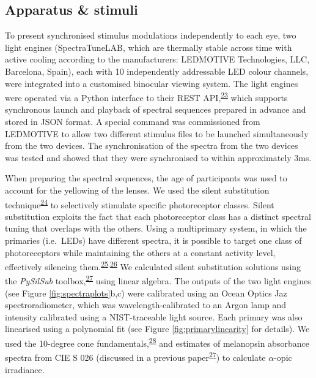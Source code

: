 \documentclass[
]{article}
\begin{document}
\hypertarget{apparatus-stimuli}{%
\subsection{Apparatus \& stimuli}\label{apparatus-stimuli}}

To present synchronised stimulus modulations independently to each eye, two light engines (SpectraTuneLAB, which are thermally stable across time with active cooling according to the manufacturers: LEDMOTIVE Technologies, LLC, Barcelona, Spain), each with 10 independently addressable LED colour channels, were integrated into a customised binocular viewing system. The light engines were operated via a Python interface to their REST API,\textsuperscript{\protect\hyperlink{ref-Martin2022}{23}} which supports synchronous launch and playback of spectral sequences prepared in advance and stored in JSON format. A special command was commissioned from LEDMOTIVE to allow two different stimulus files to be launched simultaneously from the two devices. The synchronisation of the spectra from the two devices was tested and showed that they were synchronised to within approximately 3ms.

When preparing the spectral sequences, the age of participants was used to account for the yellowing of the lenses. We used the silent substitution technique\textsuperscript{\protect\hyperlink{ref-Estevez1982}{24}} to selectively stimulate specific photoreceptor classes. Silent substitution exploits the fact that each photoreceptor class has a distinct spectral tuning that overlaps with the others. Using a multiprimary system, in which the primaries (i.e.~LEDs) have different spectra, it is possible to target one class of photoreceptors while maintaining the others at a constant activity level, effectively silencing them.\textsuperscript{\protect\hyperlink{ref-Shapiro1996}{25},\protect\hyperlink{ref-Spitschan2018}{26}} We calculated silent substitution solutions using the \emph{PySilSub} toolbox,\textsuperscript{\protect\hyperlink{ref-Martin2023}{27}} using linear algebra. The outputs of the two light engines (see Figure \ref{fig:spectraplots}b,c) were calibrated using an Ocean Optics Jaz spectroradiometer, which was wavelength-calibrated to an Argon lamp and intensity calibrated using a NIST-traceable light source. Each primary was also linearised using a polynomial fit (see Figure \ref{fig:primarylinearity} for details). We used the 10-degree cone fundamentals,\textsuperscript{\protect\hyperlink{ref-Stockman2000}{28}} and estimates of melanopsin absorbance spectra from CIE S 026 (discussed in a previous paper\textsuperscript{\protect\hyperlink{ref-Martin2023}{27}}) to calculate \(\alpha\)-opic irradiance.
\end{document}
